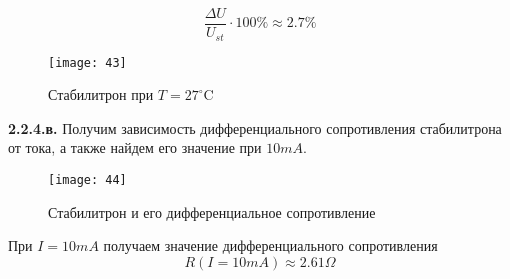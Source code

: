 \documentclass{semi}
\newcommand{\Cd}{^{\circ}\mathrm{C}}
\begin{document}
$$ \dfrac{\Delta U}{U_{st}} \cdot 100\% \approx 2.7\% $$

\begin{figure}[H]
	\centering
	\texttt{[image: 43]}
	\caption{Стабилитрон при $ T = 27 \Cd $}
	\label{2.2.4.2}
\end{figure}

\newpage

\textbf{{\normalsize 2.2.4.в.}}
Получим зависимость дифференциального сопротивления стабилитрона от тока, а также найдем его значение при $ 10mA $.

\begin{figure}[H]
	\centering
	\texttt{[image: 44]}
	\caption{Стабилитрон и его дифференциальное сопротивление }
	\label{2.2.4.3}
\end{figure}

При $ I = 10mA $ получаем значение дифференциального сопротивления
$$ R(I=10mA) \approx 2.61 \Omega $$
\end{document}
